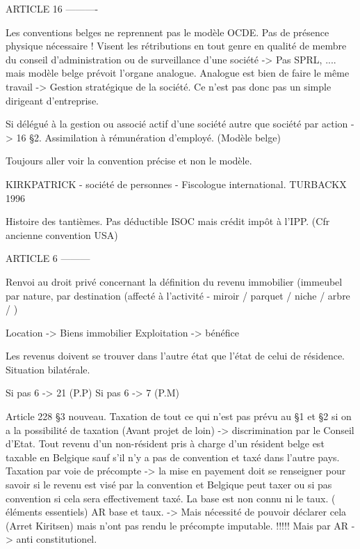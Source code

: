 \documentclass{book}
\begin{document}
ARTICLE 16
----------

Les conventions belges ne reprennent pas le modèle OCDE. Pas de présence physique nécessaire ! Visent les rétributions en tout genre en qualité de membre du conseil d'administration ou de surveillance d'une société -> Pas SPRL, .... mais modèle belge prévoit l'organe analogue. Analogue est bien de faire le même travail -> Gestion stratégique de la société. Ce n'est pas donc pas un simple dirigeant d'entreprise.

Si délégué à la gestion ou associé actif d'une société autre que société par action -> 16 §2. Assimilation à rémunération d'employé. (Modèle belge)

Toujours aller voir la convention précise et non le modèle. 

KIRKPATRICK - société de personnes - Fiscologue international. TURBACKX 1996

Histoire des tantièmes. Pas déductible ISOC mais crédit impôt à l'IPP. (Cfr ancienne convention USA)


ARTICLE 6
---------

Renvoi au droit privé concernant la définition du revenu immobilier (immeubel par nature, par destination (affecté à l'activité - miroir / parquet / niche / arbre / )

Location -> Biens immobilier
Exploitation -> bénéfice

Les revenus doivent se trouver dans l'autre état que l'état de celui de résidence. Situation bilatérale.

Si pas 6 -> 21 (P.P)
Si pas 6 -> 7 (P.M)

Article 228 §3 nouveau. Taxation de tout ce qui n'est pas prévu au §1 et §2 si on a la possibilité de taxation (Avant projet de loin) -> discrimination par le Conseil d'Etat. Tout revenu d'un non-résident pris à charge d'un résident belge est taxable en Belgique sauf s'il n'y a pas de convention et taxé dans l'autre pays. Taxation par voie de précompte -> la mise en payement doit se renseigner pour savoir si le revenu est visé par la convention et Belgique peut taxer ou si pas convention si cela sera effectivement taxé. La base est non connu ni le taux. ( éléments essentiels) AR base et taux. -> Mais nécessité de pouvoir déclarer cela (Arret Kiritsen) mais n'ont pas rendu le précompte imputable. !!!!! Mais par AR -> anti constitutionel.






\nocite{*}

\end{document}
